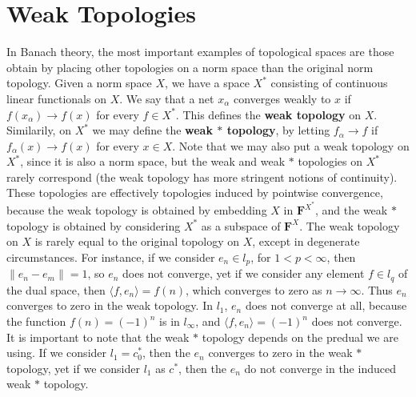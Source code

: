 






\chapter{Weak Topologies}

\begin{example}
    In Banach theory, the most important examples of topological spaces are those obtain by placing other topologies on a norm space than the original norm topology. Given a norm space $X$, we have a space $X^*$ consisting of continuous linear functionals on $X$. We say that a net $x_\alpha$ converges weakly to $x$ if $f(x_\alpha) \to f(x)$ for every $f \in X^*$. This defines the {\bf weak topology} on $X$. Similarily, on $X^*$ we may define the {\bf weak $*$ topology}, by letting $f_\alpha \to f$ if $f_\alpha(x) \to f(x)$ for every $x \in X$. Note that we may also put a weak topology on $X^*$, since it is also a norm space, but the weak and weak $*$ topologies on $X^*$ rarely correspond (the weak topology has more stringent notions of continuity). These topologies are effectively topologies induced by pointwise convergence, because the weak topology is obtained by embedding $X$ in $\mathbf{F}^{X^*}$, and the weak $*$ topology is obtained by considering $X^*$ as a subspace of $\mathbf{F}^X$. The weak topology on $X$ is rarely equal to the original topology on $X$, except in degenerate circumstances. For instance, if we consider $e_n \in l_p$, for $1 < p < \infty$, then $\| e_n - e_m \| = 1$, so $e_n$ does not converge, yet if we consider any element $f \in l_q$ of the dual space, then $\langle f, e_n \rangle = f(n)$, which converges to zero as $n \to \infty$. Thus $e_n$ converges to zero in the weak topology. In $l_1$, $e_n$ does not converge at all, because the function $f(n) = (-1)^n$ is in $l_\infty$, and $\langle f, e_n \rangle = (-1)^n$ does not converge. It is important to note that the weak $*$ topology depends on the predual we are using. If we consider $l_1 = c_0^*$, then the $e_n$ converges to zero in the weak $*$ topology, yet if we consider $l_1$ as $c^*$, then the $e_n$ do not converge in the induced weak $*$ topology.


\end{example}
